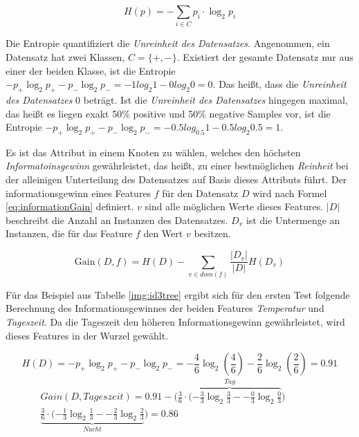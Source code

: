 \begin{equation}
H(p) = -\sum_{i \in C} p_i \cdot \log_{2} p_i
\label{eq:entropy}
\end{equation}

Die Entropie quantifiziert die \emph{Unreinheit des Datensatzes}. Angenommen, ein Datensatz hat zwei Klassen, $C = \{+,-\}$. Existiert der gesamte Datensatz nur aus einer der beiden Klasse, ist die Entropie $- p_{+} \log_{2} p_{+}- p_{-}  \log_{2} p_{-} = -1 log_{2} 1 -0 log_{2} 0 = 0$. Das heißt, dass die \emph{Unreinheit des Datensatzes} $0$  beträgt. Ist die \emph{Unreinheit des Datensatzes} hingegen maximal, das heißt es liegen exakt 50\% positive und 50\% negative Samples vor, ist die Entropie $- p_{+} \log_{2} p_{+} - p_{-}  \log_{2} p_{-} = -0.5 log_{0.5} 1 - 0.5 log_{2} 0.5 = 1$. \cite[S. 135]{machine_marsland}

Es ist das Attribut in einem Knoten zu wählen, welches den höchsten \emph{Informatoinsgewinn} gewährleistet, das heißt, zu einer bestmöglichen \emph{Reinheit} bei der alleinigen Unterteilung des Datensatzes auf Basis dieses Attributs führt. Der informationsgewinn eines Features $f$ für den Datensatz $D$ wird nach Formel \ref{eq:informationGain} definiert. $v$ sind alle möglichen Werte dieses Features. $|D|$ beschreibt die Anzahl an Instanzen des Datensatzes. $D_v$ ist die Untermenge an Instanzen, die für das Feature $f$ den Wert $v$ besitzen.\cite[S. 136 - 137]{machine_marsland}

\begin{equation}
\text{Gain}(D,f) = H(D) - \sum_{v \in dom(f)} \frac{|D_v|}{|D|} H(D_v)
\label{eq:informationGain}
\end{equation}

Für das Beispiel aus Tabelle \ref{img:id3tree} ergibt sich für den ersten Test folgende Berechnung des Informationsgewinnes der beiden Features \emph{Temperatur} und \emph{Tageszeit}. Da die Tageszeit den höheren Informationsgewinn gewährleistet, wird dieses Features in der Wurzel gewählt. 

\begin{equation}
H(D) = - p_{+} \log_{2} p_{+} - p_{-}  \log_{2} p_{-} = -\frac{4}{6} \log_{2} (\frac{4}{6}) -\frac{2}{6} \log_{2}( \frac{2}{6} ) = 0.91
\end{equation}
\begin{equation}
\begin{split}
Gain(D,Tageszeit) = 0.91 - \Big( \overbrace{\frac{3}{6} \cdot (-\frac{3}{3} \log_{2} \frac{3}{3} -  -\frac{0}{3} \log_{2} \frac{0}{3} }^{Tag}   )\ \quad \quad \quad \; \\
\underbrace{\frac{3}{6} \cdot (-\frac{1}{3} \log_{2} \frac{1}{3} -  -\frac{2}{3} \log_{2} \frac{2}{3} }_{Nacht}   \Big)  = 0.86
\end{split}
\end{equation}

